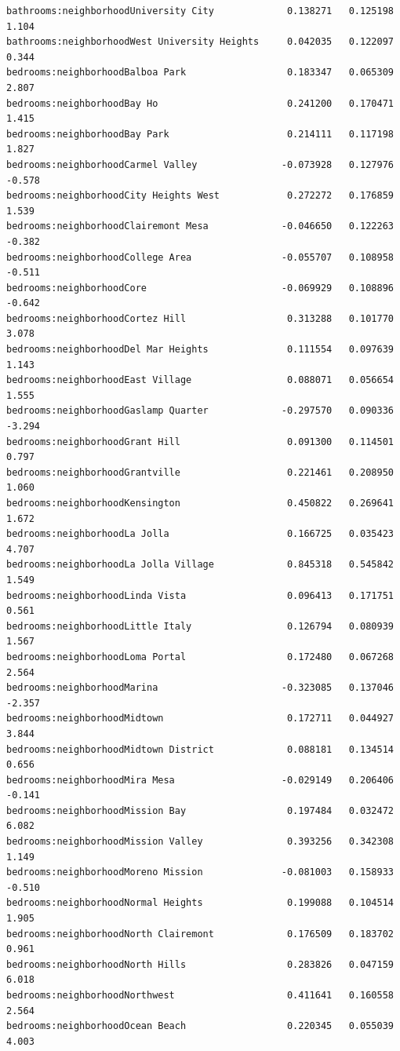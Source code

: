\documentclass[
  letterpaper,
  DIV=11,
  numbers=noendperiod,
  oneside]{scrreprt}
\begin{document}
\begin{verbatim}
bathrooms:neighborhoodUniversity City             0.138271   0.125198   1.104
bathrooms:neighborhoodWest University Heights     0.042035   0.122097   0.344
bedrooms:neighborhoodBalboa Park                  0.183347   0.065309   2.807
bedrooms:neighborhoodBay Ho                       0.241200   0.170471   1.415
bedrooms:neighborhoodBay Park                     0.214111   0.117198   1.827
bedrooms:neighborhoodCarmel Valley               -0.073928   0.127976  -0.578
bedrooms:neighborhoodCity Heights West            0.272272   0.176859   1.539
bedrooms:neighborhoodClairemont Mesa             -0.046650   0.122263  -0.382
bedrooms:neighborhoodCollege Area                -0.055707   0.108958  -0.511
bedrooms:neighborhoodCore                        -0.069929   0.108896  -0.642
bedrooms:neighborhoodCortez Hill                  0.313288   0.101770   3.078
bedrooms:neighborhoodDel Mar Heights              0.111554   0.097639   1.143
bedrooms:neighborhoodEast Village                 0.088071   0.056654   1.555
bedrooms:neighborhoodGaslamp Quarter             -0.297570   0.090336  -3.294
bedrooms:neighborhoodGrant Hill                   0.091300   0.114501   0.797
bedrooms:neighborhoodGrantville                   0.221461   0.208950   1.060
bedrooms:neighborhoodKensington                   0.450822   0.269641   1.672
bedrooms:neighborhoodLa Jolla                     0.166725   0.035423   4.707
bedrooms:neighborhoodLa Jolla Village             0.845318   0.545842   1.549
bedrooms:neighborhoodLinda Vista                  0.096413   0.171751   0.561
bedrooms:neighborhoodLittle Italy                 0.126794   0.080939   1.567
bedrooms:neighborhoodLoma Portal                  0.172480   0.067268   2.564
bedrooms:neighborhoodMarina                      -0.323085   0.137046  -2.357
bedrooms:neighborhoodMidtown                      0.172711   0.044927   3.844
bedrooms:neighborhoodMidtown District             0.088181   0.134514   0.656
bedrooms:neighborhoodMira Mesa                   -0.029149   0.206406  -0.141
bedrooms:neighborhoodMission Bay                  0.197484   0.032472   6.082
bedrooms:neighborhoodMission Valley               0.393256   0.342308   1.149
bedrooms:neighborhoodMoreno Mission              -0.081003   0.158933  -0.510
bedrooms:neighborhoodNormal Heights               0.199088   0.104514   1.905
bedrooms:neighborhoodNorth Clairemont             0.176509   0.183702   0.961
bedrooms:neighborhoodNorth Hills                  0.283826   0.047159   6.018
bedrooms:neighborhoodNorthwest                    0.411641   0.160558   2.564
bedrooms:neighborhoodOcean Beach                  0.220345   0.055039   4.003

\end{verbatim}
\end{document}
